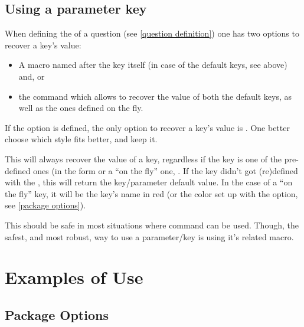 \documentclass[10pt]{article}
\begin{document}
\subsection{Using a parameter key}
When defining the  of a question (see \ref{question definition}) one has two options to recover a key's value:
\begin{itemize}
  \item A macro named after the key itself (in case of the default keys, see above) and, or
  \item the \tsobj{\QuestVal} command which allows to recover the value of both the default keys, as well as the ones defined on the fly.
\end{itemize}
\begin{tsremark}
If the option  is defined, the only option to recover a key's value is \tsobj{\QuestVal}. One better choose which style fits better, and keep it.
\end{tsremark}


\begin{codedescribe}{\QuestVal}
\begin{codesyntax}%
\end{codesyntax}
This will always recover the value of a key, regardless if the key is one of the pre-defined ones (in the form  or a ``on the fly'' one, .
If the key didn't got (re)defined with the , this will return the key/parameter default value. In the case of a ``on the fly'' key, it will be the key's name in red (or the color set up with the  option, see \ref{package options}).

This should be safe in most situations where \tsobj{\pgfkeys} command can be used. Though, the safest, and most robust, way to use a parameter/key is using it's related macro.
\end{codedescribe}

\section{Examples of Use}

\subsection{Package Options}
\begin{codestore}
\usepackage{tikzquests}
\end{codestore}
\end{document}
